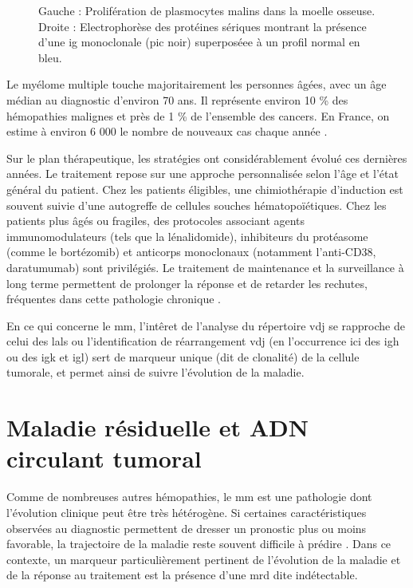 \begin{figure}[H]
\begin{minipage}{0.45\textwidth}
    \end{minipage}
    \caption{Gauche : Prolifération de plasmocytes malins dans la moelle osseuse. 
    Droite : Electrophorèse des protéines sériques montrant la présence d'une \gls{ig} monoclonale (pic noir) 
    superposéee à un profil normal en bleu.}
    \label{fig:mm-cells-ig}
\end{figure}

Le myélome multiple touche majoritairement les personnes âgées, avec un âge médian au diagnostic d'environ 70 ans. Il représente environ 10 \%
des hémopathies malignes et près de 1 \% de l'ensemble des cancers. En France, on estime à environ 6 000 le nombre de nouveaux cas chaque année 
\cite{spfSurviePersonnesAtteintes}.

Sur le plan thérapeutique, les stratégies ont considérablement évolué ces dernières années. Le traitement repose sur une approche personnalisée
selon l'âge et l'état général du patient. Chez les patients éligibles, une chimiothérapie d'induction est souvent suivie d'une autogreffe de cellules
souches hématopoïétiques. Chez les patients plus âgés ou fragiles, des protocoles associant agents immunomodulateurs (tels que la lénalidomide),
inhibiteurs du protéasome (comme le bortézomib) et anticorps monoclonaux (notamment l'anti-CD38, daratumumab) sont privilégiés. Le traitement de
maintenance et la surveillance à long terme permettent de prolonger la réponse et de retarder les rechutes, fréquentes dans cette pathologie chronique 
\cite{cowanDiagnosisManagementMultiple2022a}.

\vspace{1em}

En ce qui concerne le \gls{mm}, l'intêret de l'analyse du répertoire \gls{vdj} se rapproche de celui des \glspl{lal} ou l'identification 
de réarrangement \gls{vdj} (en l'occurrence ici des \gls{igh} ou des \gls{igk} et \gls{igl}) sert de marqueur unique (dit de clonalité) 
de la cellule tumorale, et permet ainsi de suivre l'évolution de la maladie.

\section{Maladie résiduelle et ADN circulant tumoral}

Comme de nombreuses autres hémopathies, le \gls{mm} est une pathologie dont l'évolution clinique peut être très hétérogène. 
Si certaines caractéristiques observées au diagnostic permettent de dresser un pronostic plus ou moins favorable, 
la trajectoire de la maladie reste souvent difficile à prédire \cite{hanamuraMultipleMyelomaHighrisk2022}. 
Dans ce contexte, un marqueur particulièrement pertinent de l'évolution de la maladie et de la réponse au traitement 
est la présence d'une \gls{mrd} dite indétectable.

